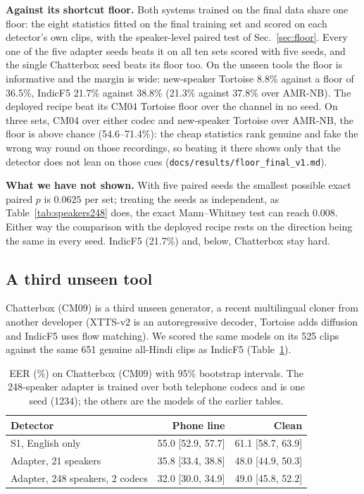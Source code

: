 \textbf{Against its shortcut floor.} Both systems trained on the final data share one
floor: the eight statistics fitted on the final training set and scored on each detector's
own clips, with the speaker-level paired test of Sec.~\ref{sec:floor}. Every one of
the five adapter seeds beats it on all ten sets scored with five seeds, and the single
Chatterbox seed beats its floor too. On the unseen tools the floor is
informative and the margin is wide: new-speaker Tortoise 8.8\% against a floor of 36.5\%,
IndicF5 21.7\% against 38.8\% (21.3\% against 37.8\% over AMR-NB). The deployed recipe
beat its CM04 Tortoise floor over the channel in no seed. On three sets, CM04 over either codec
and new-speaker Tortoise over AMR-NB, the floor is above chance (54.6--71.4\%): the cheap
statistics rank genuine and fake the wrong way round on those recordings, so beating it
there shows only that the detector does not lean on those cues
(\texttt{docs/results/floor\_final\_v1.md}).

\textbf{What we have not shown.} With five paired seeds the smallest possible exact paired
$p$ is $0.0625$ per set; treating the seeds as independent, as Table~\ref{tab:speakers248}
does, the exact Mann--Whitney test can reach $0.008$. Either way the comparison with the
deployed recipe rests on the direction being the same in every seed. IndicF5 (21.7\%) and, below, Chatterbox stay hard.

\subsection{A third unseen tool}
\label{sec:res-chatterbox}

Chatterbox (CM09) is a third unseen generator, a recent multilingual cloner from another
developer (XTTS-v2 is an autoregressive decoder, Tortoise adds diffusion and IndicF5 uses
flow matching). We scored the same models on its 525 clips
against the same 651 genuine all-Hindi clips as IndicF5 (Table~\ref{tab:chatterbox}).

\begin{table}[t]
\centering
\caption{EER (\%) on Chatterbox (CM09) with 95\% bootstrap intervals. The 248-speaker
adapter is trained over both telephone codecs and is one seed (1234); the others are the
models of the earlier tables.}
\label{tab:chatterbox}
\footnotesize
\begin{tabular}{@{}lrr@{}}
\toprule
Detector & Phone line & Clean \\
\midrule
S1, English only             & 55.0 [52.9, 57.7] & 61.1 [58.7, 63.9] \\
Adapter, 21 speakers         & 35.8 [33.4, 38.8] & 48.0 [44.9, 50.3] \\
Adapter, 248 speakers, 2 codecs & 32.0 [30.0, 34.9] & 49.0 [45.8, 52.2] \\
\bottomrule
\end{tabular}
\end{table}

